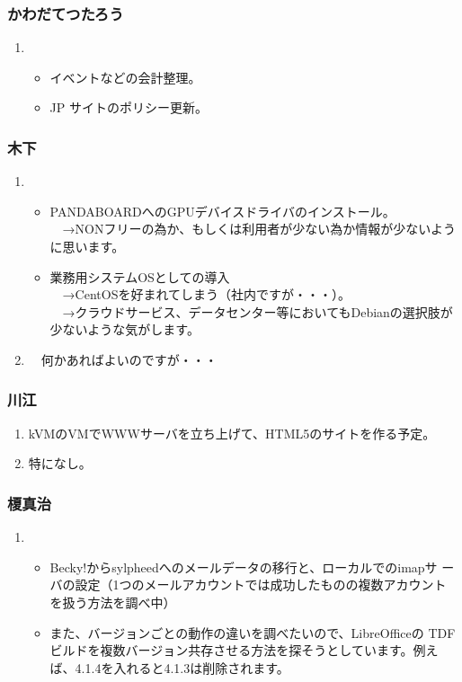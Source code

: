 \documentclass[cjk,dvipdfmx,10pt,compress,%
hyperref={bookmarks=true,bookmarksnumbered=true,bookmarksopen=false,%
colorlinks=false,%
pdftitle={第 80 回 関西 Debian 勉強会},%
pdfauthor={倉敷・のがた・佐々木・かわだ・八津尾},%
pdfsubject={資料},%
}]{beamer}
\begin{document}
\begin{frame}
  \frametitle{ かわだてつたろう }
  \begin{enumerate}
  \item 
    \begin{itemize}
    \item イベントなどの会計整理。
    \item JP サイトのポリシー更新。
    \end{itemize}
  \end{enumerate}
\end{frame}

\begin{frame}
  \frametitle{ 木下 }
  \begin{enumerate}
  \item 
    \begin{itemize}
    \item PANDABOARDへのGPUデバイスドライバのインストール。\\
      　→NONフリーの為か、もしくは利用者が少ない為か情報が少ないように思います。
    \item 業務用システムOSとしての導入\\
      　→CentOSを好まれてしまう（社内ですが・・・）。\\
      　→クラウドサービス、データセンター等においてもDebianの選択肢が少ないような気がします。

    \end{itemize}
  \item 
    　何かあればよいのですが・・・
  \end{enumerate}
\end{frame}

\begin{frame}
  \frametitle{ 川江 }
  \begin{enumerate}
  \item kVMのVMでWWWサーバを立ち上げて、HTML5のサイトを作る予定。
  \item 特になし。
  \end{enumerate}
\end{frame}

\begin{frame}
  \frametitle{ 榎真治 }
  \begin{enumerate}
  \item
    \begin{itemize}
    \item Becky!からsylpheedへのメールデータの移行と、ローカルでのimapサ
      ーバの設定（1つのメールアカウントでは成功したものの複数アカウント
        を扱う方法を調べ中）
    \item また、バージョンごとの動作の違いを調べたいので、LibreOfficeの
      TDFビルドを複数バージョン共存させる方法を探そうとしています。例え
      ば、4.1.4を入れると4.1.3は削除されます。
    \end{itemize}
  \end{enumerate}
\end{frame}
\end{document}
